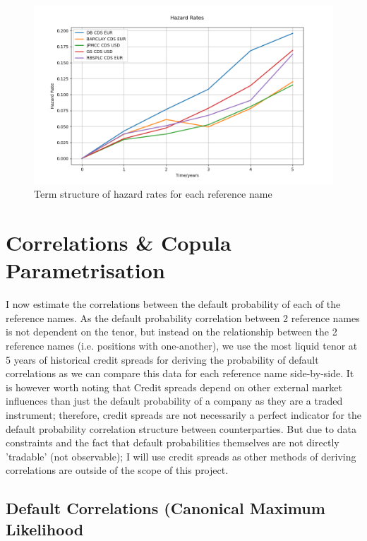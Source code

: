 \documentclass{report}
\theoremstyle{plain}
\theoremstyle{definition}
\begin{document}
\begin{figure}[H]
	\begin{center}
		\includegraphics[width=15cm]{Hazard_Rates.png}
		\caption{Term structure of hazard rates for each reference name} 
		\label{Hazard_Rates}
	\end{center}
\end{figure}


\chapter{Correlations \& Copula Parametrisation}

I now estimate the correlations between the default probability of each of the reference names. As the default probability correlation between 2 reference names is not dependent on the tenor, but instead on the relationship between the 2 reference names (i.e. positions with one-another), we use the most liquid tenor at 5 years of historical credit spreads for deriving the probability of default correlations as we can compare this data for each reference name side-by-side. It is however worth noting that Credit spreads depend on other external market influences than just the default probability of a company as they are a traded instrument; therefore, credit spreads are not necessarily a perfect indicator for the default probability correlation structure between counterparties. But due to data constraints and the fact that default probabilities themselves are not directly 'tradable' (not observable); I will use credit spreads as other methods of deriving correlations are outside of the scope of this project.\\

\section{Default Correlations (Canonical Maximum Likelihood}
\end{document}
